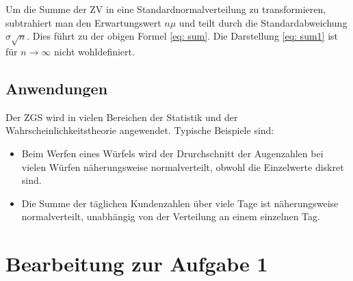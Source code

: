 \documentclass{article}
\begin{document}
Um die Summe der ZV in eine Standardnormalverteilung zu transformieren, subtrahiert man den Erwartungswert $n\mu$ und teilt durch die Standardabweichung $\sigma \sqrt{n}$. Dies führt zu der obigen Formel \eqref{eq: sum}. Die Darstellung \eqref{eq: sum1} ist für ${n \to \infty}$ nicht wohldefiniert.

\subsection{Anwendungen}

Der ZGS wird in vielen Bereichen der Statistik und der Wahrscheinlichkeitstheorie angewendet. Typische Beispiele sind:
\begin{itemize}
    \item  Beim Werfen eines Würfels wird der Drurchschnitt der Augenzahlen bei vielen Würfen näherungsweise normalverteilt, obwohl die Einzelwerte diskret sind.
    \item Die Summe der täglichen Kundenzahlen über viele Tage ist näherungsweise normalverteilt, unabhängig von der Verteilung an einem einzelnen Tag.
    
\end{itemize}

\newpage
\section{Bearbeitung zur Aufgabe 1}
\end{document}
